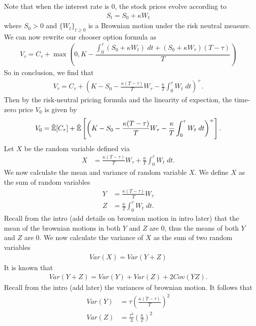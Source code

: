 \documentclass[reqno]{amsart}
\begin{document}
Note that when the interest rate is $0$, the stock prices evolve according to 
\begin{align}
     S_t = S_0 + \kappa W_t
\end{align}
where $S_0 > 0$ and $\{W_t\}_{t \ge 0}$ is a Brownian motion under the risk neutral measure. We can now rewrite our chooser option formula as
\begin{align}
     V_\tau = C_\tau + \max(0, K - \dfrac{\int_0^\tau \left( S_0 + \kappa W_t \right) \; dt + (S_0 + \kappa W_\tau) (T - \tau)}{T})
\end{align}
So in conclusion, we find that 
\begin{align}
     V_\tau = C_\tau + \left(K- S_0 - \frac{\kappa(T-\tau)}{T} W_\tau - \frac{\kappa}{T} \int_0^\tau W_t \; dt  \right)^+.
\end{align}
Then by the risk-neutral pricing formula and the linearity of expection, the time-zero price $V_0$ is given by
\begin{align} \label{eq: expect form}
     V_0 = \tilde{\mathbb{E}}[C_\tau] + \tilde{\mathbb{E}}\left[\left(K- S_0 - \frac{\kappa(T-\tau)}{T} W_\tau - \frac{\kappa}{T} \int_0^\tau W_t \; dt  \right)^+\right].
\end{align}
Let $X$ be the random variable defined via 
\begin{align}
     X &= \frac{\kappa(T-\tau)}{T} W_\tau + \frac{\kappa}{T} \int_0^\tau W_t \; dt.
\end{align}
We now calculate the mean and variance of random variable $X$. We define $X$ as the sum of random variables
\begin{align}
     Y &= \frac{\kappa(T-\tau)}{T} W_\tau\\
     Z &= \frac{\kappa}{T} \int_0^\tau W_t \; dt.
\end{align}
Recall from the intro (add details on brownian motion in intro later) that the mean of the brownian motions in both $Y$ and $Z$ are $0$, thus the means of both $Y$ and $Z$ are 0. 
We now calculate the variance of $X$ as the sum of two random variables
\begin{align}
     Var(X) = Var(Y + Z)
\end{align}
It is known that
\begin{align}
     Var(Y + Z) = Var(Y) + Var(Z) + 2Cov(YZ).
\end{align}
Recall from the intro (add later) the variances of brownian motion. It follows that 
\begin{align}
     Var(Y) &= \tau(\frac{\kappa(T-\tau)}{T})^2\\
     Var(Z) &= \frac{\tau^3}{3}(\frac{\kappa}{T})^2
\end{align}
\end{document}
